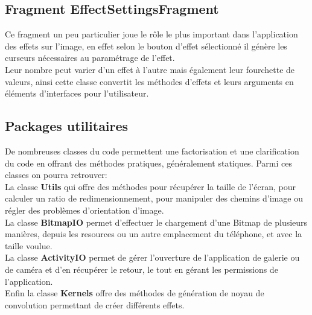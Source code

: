 \subsection{Fragment \textbf{EffectSettingsFragment}} \label{effect_settings}
Ce fragment un peu particulier joue le rôle le plus important dans l'application des effets sur l'image, en effet selon le bouton d'effet sélectionné il génère les curseurs nécessaires au paramétrage de l'effet.
\\
Leur nombre peut varier d'un effet à l'autre mais également leur fourchette de valeurs, ainsi cette classe convertit les méthodes d'effets et leurs arguments en éléments d'interfaces pour l'utilisateur.

\subsection{Packages utilitaires}
De nombreuses classes du code permettent une factorisation et une clarification du code en offrant des méthodes pratiques, généralement statiques. Parmi ces classes on pourra retrouver:
\\

La classe \textbf{Utils} qui offre des méthodes pour récupérer la taille de l'écran, pour calculer un ratio de redimensionnement, pour manipuler des chemins d'image ou régler des problèmes d'orientation d'image.
\\

La classe \textbf{BitmapIO} permet d'effectuer le chargement d'une Bitmap de plusieurs manières, depuis les resources ou un autre emplacement du téléphone, et avec la taille voulue.
\\

La classe \textbf{ActivityIO} permet de gérer l'ouverture de l'application de galerie ou de caméra et d'en récupérer le retour, le tout en gérant les permissions de l'application.
\\

Enfin la classe \textbf{Kernels} offre des méthodes de génération de noyau de convolution permettant de créer différents effets.
\\

